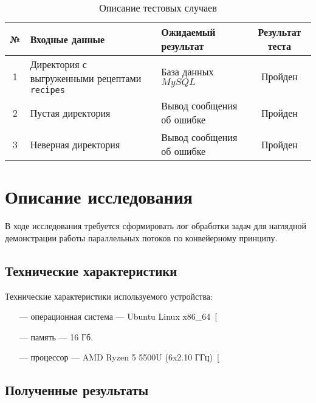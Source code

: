 \begin{table}[h!]
    \begin{center}
		\begin{threeparttable}
    \caption{Описание тестовых случаев}
    \captionsetup{justification=raggedright, singlelinecheck=false}
    \label{tbl:tests}
    \begin{tabular}{|c|p{6cm}|p{6cm}|c|}
        \hline
        \textbf{№} & \textbf{Входные данные} & \textbf{Ожидаемый результат} & \textbf{Результат теста} \\
        \hline
        1 & Директория с выгруженными рецептами \texttt{recipes} & База данных $MySQL$  & Пройден \\
        \hline
        2 & Пустая директория & Вывод сообщения об ошибке & Пройден \\
        \hline
        3 & Неверная директория & Вывод сообщения об ошибке & Пройден \\
        \hline
    \end{tabular}
    \end{threeparttable}
    \end{center}
\end{table}



\chapter{Описание исследования}
В ходе исследования требуется сформировать лог обработки задач для наглядной демонстрации работы параллельных потоков по конвейерному принципу. 

\section{Технические характеристики}
Технические характеристики используемого устройства:
\begin{itemize}
    \item[---] операционная система --- Ubuntu Linux x86\_64~[\cite{Ubuntu}
    \item[---] память --- 16 Гб.
    \item[---] процессор --- AMD Ryzen 5 5500U (6x2.10 ГГц)~[\cite{AMD}
\end{itemize}

\section{Полученные результаты}

